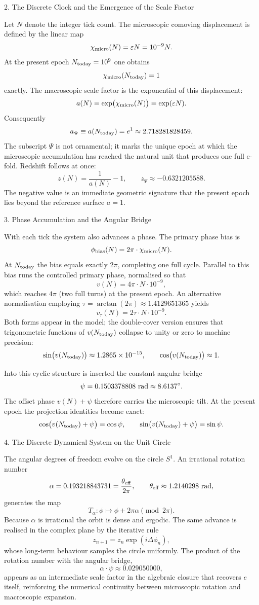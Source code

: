 2. The Discrete Clock and the Emergence of the Scale Factor

Let \(N\) denote the integer tick count. The microscopic comoving displacement is defined by the linear map
\[
\chi_{\rm micro}(N)=\varepsilon N=10^{-9}N.
\]
At the present epoch \(N_{\rm today}=10^{9}\) one obtains
\[
\chi_{\rm micro}(N_{\rm today})=1
\]
exactly. The macroscopic scale factor is the exponential of this displacement:
\[
a(N)=\exp\bigl(\chi_{\rm micro}(N)\bigr)=\exp(\varepsilon N).
\]
Consequently
\[
a_{\Psi}\equiv a(N_{\rm today})=e^{1}\approx 2.718281828459.
\]
The subscript \(\Psi\) is not ornamental; it marks the unique epoch at which the microscopic accumulation has reached the natural unit that produces one full e-fold. Redshift follows at once:
\[
z(N)=\frac{1}{a(N)}-1,\qquad z_{\Psi}\approx-0.6321205588.
\]
The negative value is an immediate geometric signature that the present epoch lies beyond the reference surface \(a=1\).

3. Phase Accumulation and the Angular Bridge

With each tick the system also advances a phase. The primary phase bias is
\[
\phi_{\rm bias}(N)=2\pi\cdot\chi_{\rm micro}(N).
\]
At \(N_{\rm today}\) the bias equals exactly \(2\pi\), completing one full cycle. Parallel to this bias runs the controlled primary phase, normalised so that
\[
v(N)=4\pi\cdot N\cdot 10^{-9},
\]
which reaches \(4\pi\) (two full turns) at the present epoch. An alternative normalisation employing \(\tau=\arctan(2\pi)\approx 1.4129651365\) yields
\[
v_{\tau}(N)=2\tau\cdot N\cdot 10^{-9}.
\]
Both forms appear in the model; the double-cover version ensures that trigonometric functions of \(v(N_{\rm today})\) collapse to unity or zero to machine precision:
\[
\sin\bigl(v(N_{\rm today})\bigr)\approx 1.2865\times 10^{-15},\qquad\cos\bigl(v(N_{\rm today})\bigr)\approx 1.
\]

Into this cyclic structure is inserted the constant angular bridge
\[
\psi=0.1503378808\ {\rm rad}\approx 8.6137^\circ.
\]
The offset phase \(v(N)+\psi\) therefore carries the microscopic tilt. At the present epoch the projection identities become exact:
\[
\cos\bigl(v(N_{\rm today})+\psi\bigr)=\cos\psi,\qquad\sin\bigl(v(N_{\rm today})+\psi\bigr)=\sin\psi.
\]

4. The Discrete Dynamical System on the Unit Circle

The angular degrees of freedom evolve on the circle \(S^{1}\). An irrational rotation number
\[
\alpha=0.193218843731=\frac{\theta_{\rm eff}}{2\pi},\qquad\theta_{\rm eff}\approx 1.2140298\ {\rm rad},
\]
generates the map
\[
T_{\alpha}:\phi\mapsto\phi+2\pi\alpha\pmod{2\pi}.
\]
Because \(\alpha\) is irrational the orbit is dense and ergodic. The same advance is realised in the complex plane by the iterative rule
\[
z_{n+1}=z_{n}\exp(i\Delta\phi_{n}),
\]
whose long-term behaviour samples the circle uniformly. The product of the rotation number with the angular bridge,
\[
\alpha\cdot\psi\approx 0.029050000,
\]
appears as an intermediate scale factor in the algebraic closure that recovers \(e\) itself, reinforcing the numerical continuity between microscopic rotation and macroscopic expansion.

